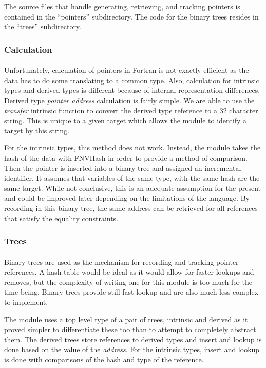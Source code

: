 \documentclass{article}
\begin{document}
The source files that handle generating, retrieving, and tracking pointers is contained in the ``pointers'' subdirectory. The code for the binary trees resides in the ``trees'' subdirectory.

\subsubsection{Calculation}
\paragraph{}
Unfortunately, calculation of pointers in Fortran is not exactly efficient as the data has to do some translating to a common type. Also, calculation for intrinsic types and derived types is different because of internal representation differences. Derived type \emph{pointer address} calculation is fairly simple. We are able to use the \emph{transfer} intrinsic function to convert the derived type reference to a 32 character string. This is unique to a given target which allows the module to identify a target by this string. 

For the intrinsic types, this method does not work. Instead, the module takes the hash of the data with FNVHash in order to provide a method of comparison. Then the pointer is inserted into a binary tree and assigned an incremental identifier. It assumes that variables of the same type, with the same hash are the same target. While not conclusive, this is an adequate assumption for the present and could be improved later depending on the limitations of the language. By recording in this binary tree, the same address can be retrieved for all references that satisfy the equality constraints.

\subsubsection{Trees}
\paragraph{}
Binary trees are used as the mechanism for recording and tracking pointer references. A hash table would be ideal as it would allow for faster lookups and removes, but the complexity of writing one for this module is too much for the time being. Binary trees provide still fast lookup and are also much less complex to implement.

The module uses a top level type of a pair of trees, intrinsic and derived as it proved simpler to differentiate these too than to attempt to completely abstract them. The derived trees store references to derived types and insert and lookup is done based on the value of the \emph{address}. For the intrinsic types, insert and lookup is done with comparisons of the hash and type of the reference.
\end{document}
